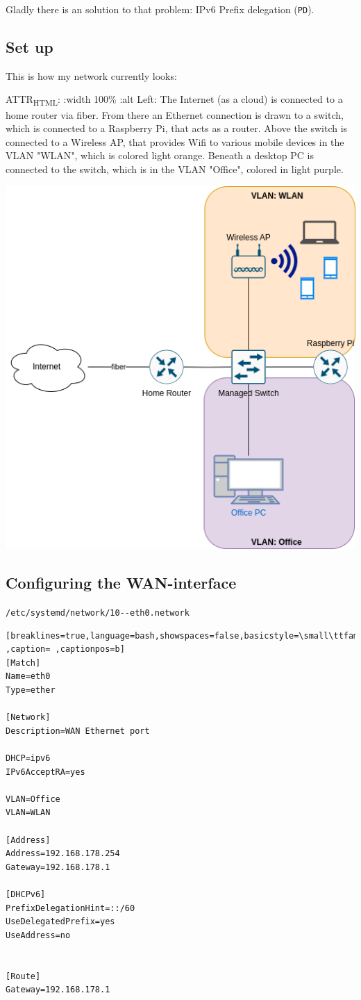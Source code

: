 \documentclass[11pt]{article}
\begin{document}
Gladly there is an solution to that problem: IPv6 Prefix delegation (\texttt{PD}).

\subsection*{Set up}
\label{sec:orgeab173b}

This is how my network currently looks:

ATTR\textsubscript{HTML}: :width 100\% :alt Left: The Internet (as a cloud) is connected to a home router via fiber. From there an Ethernet connection is drawn to a switch, which is connected to a Raspberry Pi, that acts as a router. Above the switch is connected to a Wireless AP, that provides Wifi to various mobile devices in the VLAN "WLAN", which is colored light orange. Beneath a desktop PC is connected to the switch, which is in the VLAN "Office", colored in light purple.
\begin{center}
	\includegraphics[width=.65\linewidth]{img/IPv6Network.png}
\end{center}



\subsection*{Configuring the WAN-interface}
\label{sec:org9a50c01}

\texttt{/etc/systemd/network/10-{}-{}eth0.network}
\begin{lstlisting}[breaklines=true,language=bash,showspaces=false,basicstyle=\small\ttfamily,keywordstyle=\color{blue},commentstyle=\color{gray},stringstyle=\color{red},numbers=left,numberstyle=\tiny,frame=tb,language=text,label= ,caption= ,captionpos=b]
[Match]
Name=eth0
Type=ether

[Network]
Description=WAN Ethernet port

DHCP=ipv6
IPv6AcceptRA=yes

VLAN=Office
VLAN=WLAN

[Address]
Address=192.168.178.254
Gateway=192.168.178.1

[DHCPv6]
PrefixDelegationHint=::/60
UseDelegatedPrefix=yes
UseAddress=no


[Route]
Gateway=192.168.178.1
\end{lstlisting}
\end{document}
